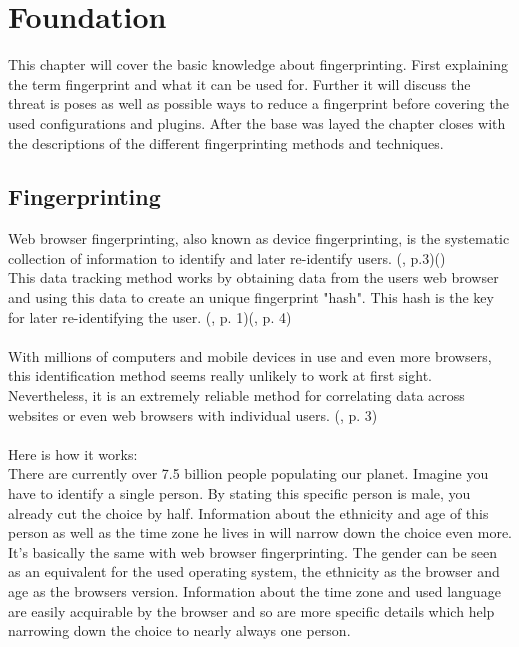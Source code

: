 \chapter{Foundation}
\label{cha:foundation}
This chapter will cover the basic knowledge about fingerprinting. First explaining the term fingerprint and what it can be used for. Further it will discuss the threat is poses as well as possible ways to reduce a fingerprint before covering the used configurations and plugins. After the base was layed the chapter closes with the descriptions of the different fingerprinting methods and techniques.

\section{Fingerprinting}
Web browser fingerprinting, also known as device fingerprinting, is the systematic collection of information to identify and later re-identify users. (\textcite{doty18}, p.3)(\textcite{amiunique})\\
This data tracking method works by obtaining data from the users web browser and using this data to create an unique fingerprint "hash". This hash is the key for later re-identifying the user. (\textcite{upi15}, p. 1)(\textcite{havens16}, p. 4)\\\\
With millions of computers and mobile devices in use and even more browsers, this identification method seems really unlikely to work at first sight. Nevertheless, it is an extremely reliable method for correlating data across websites or even web browsers with individual users. (\textcite{havens16}, p. 3)\\\\
Here is how it works:\\
There are currently over 7.5 billion people populating our planet. Imagine you have to identify a single person. By stating this specific person is male, you already cut the choice by half. Information about the ethnicity and age of this person as well as the time zone he lives in will narrow down the choice even more.\\
It's basically the same with web browser fingerprinting. The gender can be seen as an equivalent for the used operating system, the ethnicity as the browser and age as the browsers version. Information about the time zone and used language are easily acquirable by the browser and so are more specific details which help narrowing down the choice to nearly always one person.\\\\
